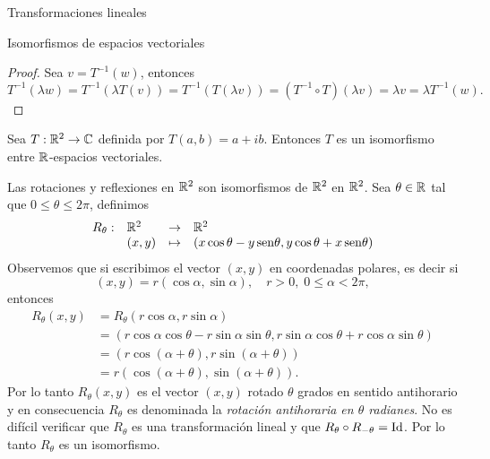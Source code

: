 \begin{chapter}{Transformaciones lineales}
\begin{section}{Isomorfismos de espacios vectoriales}
\begin{proof}
            Sea $v = T^{-1}(w)$, entonces
            \begin{equation*}
            T^{-1}(\lambda w) = 	T^{-1}(\lambda T(v))  = 	T^{-1}(T(\lambda v)) = (T^{-1}\circ T)(\lambda v) = \lambda v = \lambda  T^{-1}(w). 
            \end{equation*}
        \end{proof}
      
        \begin{ejemplo*}
            Sea $T: \mathbb R^2 \to \mathbb C$ definida por $T(a,b) = a+ ib$. Entonces $T$ es un isomorfismo entre $\mathbb R$-espacios vectoriales. 
        \end{ejemplo*}

        \begin{ejemplo} Las rotaciones y reflexiones en $\mathbb R^2$ son isomorfismos de  $\mathbb R^2$  en  $\mathbb R^2$.  Sea $\theta \in \mathbb R$ tal que  $0 \le \theta \le 2\pi$,  definimos
            \begin{equation*}
                \begin{array}{llll}
                R_\theta:&\mathbb R^2 &\to &\mathbb R^2 \\
                &(x,y) &\mapsto & (x \cos\theta - y {\,\operatorname{sen}}\theta, y\cos\theta+ x{\,\operatorname{sen}}\theta)
                \end{array}
            \end{equation*}
            Observemos que si escribimos el vector $(x,y)$  en coordenadas polares,  es decir  si 
            $$
            (x,y)= r(\cos\alpha,\sin\alpha),\quad r> 0, \; 0 \le \alpha < 2\pi, 
            $$
            entonces
            \begin{align*}
                R_\theta(x,y) &= R_\theta(r\cos\alpha,r\sin\alpha) \\
                &= (r\cos\alpha \cos\theta - r\sin\alpha \sin\theta, r\sin\alpha\cos\theta+ r\cos\alpha\sin\theta) \\
                &= (r\cos(\alpha+\theta) , r\sin(\alpha+\theta)) \\
                &= r(\cos(\alpha+\theta) , \sin(\alpha+\theta)).
            \end{align*}
            Por lo tanto $R_\theta(x,y)$ es el vector $(x,y)$ rotado $\theta$ grados en sentido antihorario y en consecuencia  $R_\theta$ es denominada la \textit{rotación antihoraria en $\theta$ radianes}. No es difícil verificar que $R_\theta$ es una transformación lineal y  que $R_\theta \circ R_{-\theta} = \operatorname{Id}$. Por lo tanto $R_\theta$  es un isomorfismo.  


\end{ejemplo}
\end{section}
\end{chapter}
